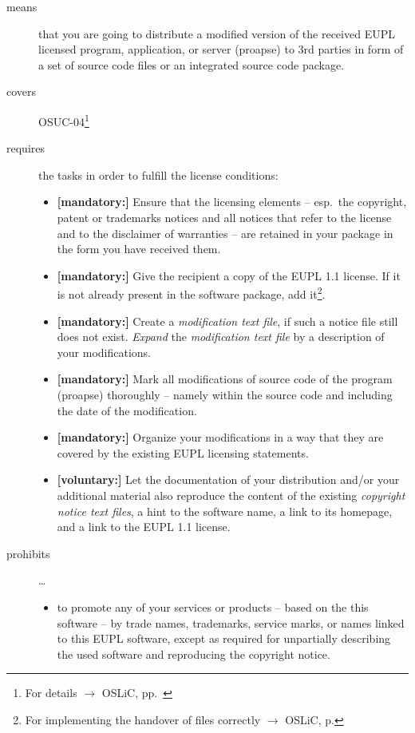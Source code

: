 \begin{description}
\item[means] that you are going to distribute a modified version of the received
EUPL licensed program, application, or server (proapse) to 3rd parties in form
of a set of source code files or an integrated source code package.
\item[covers] OSUC-04\footnote{For details $\rightarrow$ OSLiC, pp.\ \pageref{OSUC-04-DEF}}
\item[requires] the tasks in order to fulfill the license conditions:
\begin{itemize}
  
  \item \textbf{[mandatory:]} Ensure that the licensing elements -- esp.\ the
  copyright, patent or trademarks notices and all notices that refer to the
  license and to the disclaimer of warranties -- are retained in your package in
  the form you have received them.
  
  \item \textbf{[mandatory:]} Give the recipient a copy of the EUPL 1.1
  license. If it is not already present in the software package, add
  it\footnote{For implementing the handover of files correctly $\rightarrow$
  OSLiC, p. \pageref{DistributingFilesHint}}.

  \item \textbf{[mandatory:]} Create a \emph{modification text file}, if such a
  notice file still does not exist. \emph{Expand} the \emph{modification text
  file} by a description of your modifications.
    
  \item \textbf{[mandatory:]} Mark all modifications of source code of the
  program (proapse) thoroughly -- namely within the source code and including
  the date of the modification.
   
  \item \textbf{[mandatory:]} Organize your modifications in a way that they are
  covered by the existing EUPL licensing statements.
   
  \item \textbf{[voluntary:]} Let the documentation of your distribution and/or
  your additional material also reproduce the content of the existing
  \emph{copyright notice text files}, a hint to the software name, a link to its
  homepage, and a link to the EUPL 1.1 license.
  
 \end{itemize}
 
\item[prohibits] \ldots
\begin{itemize}
  \item to promote any of your services or products -- based on the this software
  -- by trade names, trademarks, service marks, or names linked to this EUPL
  software, except as required for unpartially describing the used software and
  reproducing the copyright notice.
\end{itemize}

\end{description}


